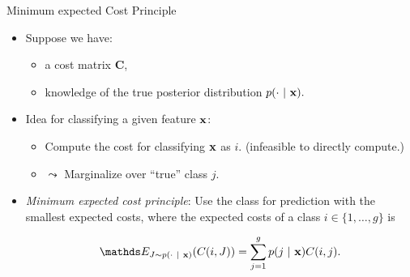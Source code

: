 \documentclass[11pt,compress,t,notes=noshow, xcolor=table]{beamer}
\begin{document}
\begin{vbframe}{Minimum expected Cost Principle}

	\footnotesize{


		\begin{itemize}\footnotesize
		
			\item Suppose we have:
            \begin{itemize}
                \footnotesize
                \item a cost matrix $\mathbf{C}$,
                \vspace{10pt}
                
                \item knowledge of the true posterior distribution $p(\cdot ~|~ \mathbf{x}).$
                \vspace{10pt}
            \end{itemize}

            \item Idea for classifying a given feature $\mathbf{x}$: 
            \begin{itemize}
                \footnotesize
                \item Compute the cost for classifying $\mathbf{x}$ as $i$. (infeasible to directly compute.)
                \vspace{10pt}
                
                \item $\leadsto$ Marginalize over ``true'' class $j$.
                \vspace{10pt}
            \end{itemize}

			\item \emph{Minimum expected cost principle}: Use the class for prediction with the smallest expected costs, where the expected costs of a class $i\in\{1,\ldots,g\}$ is
	
			$$ 	\E_{J \sim p(\cdot ~|~ \xv)}( C(i,J) ) = \sum_{j=1}^g 	p(j ~|~ \xv) C(i,j).	$$

			
				
		\end{itemize}
	}
\end{vbframe}
\end{document}
